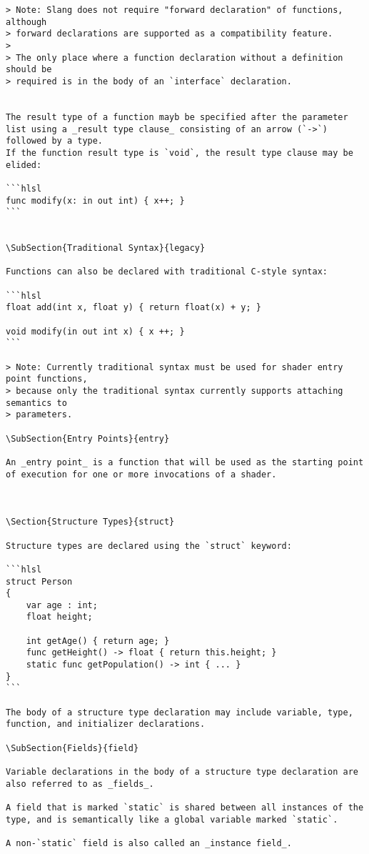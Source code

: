 \begin{verbatim}
> Note: Slang does not require "forward declaration" of functions, although
> forward declarations are supported as a compatibility feature.
>
> The only place where a function declaration without a definition should be
> required is in the body of an `interface` declaration.


The result type of a function mayb be specified after the parameter list using a _result type clause_ consisting of an arrow (`->`) followed by a type.
If the function result type is `void`, the result type clause may be elided:

```hlsl
func modify(x: in out int) { x++; }
```


\SubSection{Traditional Syntax}{legacy}

Functions can also be declared with traditional C-style syntax:

```hlsl
float add(int x, float y) { return float(x) + y; }

void modify(in out int x) { x ++; }
```

> Note: Currently traditional syntax must be used for shader entry point functions,
> because only the traditional syntax currently supports attaching semantics to
> parameters.

\SubSection{Entry Points}{entry}

An _entry point_ is a function that will be used as the starting point of execution for one or more invocations of a shader.



\Section{Structure Types}{struct}

Structure types are declared using the `struct` keyword:

```hlsl
struct Person
{
    var age : int;
    float height;

    int getAge() { return age; }
    func getHeight() -> float { return this.height; }
    static func getPopulation() -> int { ... }
}
```

The body of a structure type declaration may include variable, type, function, and initializer declarations.

\SubSection{Fields}{field}

Variable declarations in the body of a structure type declaration are also referred to as _fields_.

A field that is marked `static` is shared between all instances of the type, and is semantically like a global variable marked `static`.

A non-`static` field is also called an _instance field_.


\end{verbatim}
